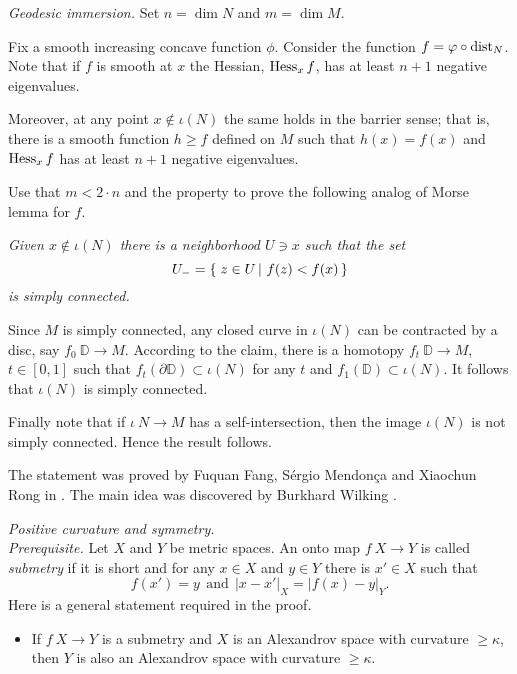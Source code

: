 \textit{Geodesic immersion.}
Set $n=\dim N$ and $m=\dim M$.

Fix a smooth increasing concave function $\phi$.
Consider the function $f=\varphi\circ\operatorname{\rm dist}_N$.
Note that if $f$ is smooth at $x$ 
the Hessian, $\operatorname{\rm Hess}\nolimits_xf$, has at least $n+1$ negative eigenvalues.

Moreover, at any point $x\notin \iota(N)$ the same holds in the barrier sense;
that is, there is a smooth function $h\ge f$ defined on $M$
such that $h(x)=f(x)$ and $\operatorname{\rm Hess}\nolimits_xf$ has at least $n+1$ negative eigenvalues.

Use that $m< 2\cdot n$ and the property to prove the following
analog of Morse lemma for $f$.

{\it Given $x\notin \iota(N)$ there is a neighborhood $U\ni x$ such that the set 
\[U_-=\set{z\in U}{f(z)<f(x)}\] is simply connected.}

\medskip

Since $M$ is simply connected,
any closed curve in $\iota(N)$
can be contracted by a disc, say $f_0\:\mathbb D\to M$.
According to the claim, 
there is a homotopy $f_t\:\mathbb D\to M$, $t\in [0,1]$ 
such that $f_t(\partial \mathbb D)\subset \iota(N)$ for any $t$ and $f_1(\mathbb D)\subset \iota(N)$.
It follows that $\iota(N)$ is simply connected.

Finally note that if $\iota\:N\to M$ has a self-intersection,
then the image
$\iota(N)$ is not simply connected.
Hence the result follows.

The statement was proved by 
Fuquan Fang, 
S\'ergio Mendon\c{c}a 
and Xiaochun Rong in \cite{FMR}.
The main idea was discovered by 
Burkhard Wilking \cite[see][]{wilking-2003}.

\textit{Positive curvature and symmetry.}\\
\textit{Prerequisite.}
Let $X$ and $Y$ be metric spaces.
An onto map $f\:X\to Y$ is called \emph{submetry} if it is short and 
for any $x\in X$ and $y\in Y$ there is $x'\in X$ such that 
\[f(x')=y\ \ \text{and}\ \  |x-x'|_X=|f(x)-y|_Y.\]
Here is a general statement required in the proof.

\begin{itemize}
\item If $f\:X\to Y$ is a  submetry
and $X$ is an Alexandrov space with curvature $\ge \kappa$, 
then $Y$ 
is also an Alexandrov space with curvature $\ge \kappa$.
\end{itemize}

